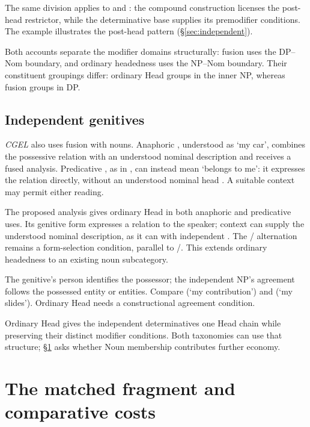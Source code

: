 \documentclass[12pt]{article}
\begin{document}
The same division applies to  and : the compound construction licenses the post-head restrictor, while the determinative base supplies its premodifier conditions. The example  illustrates the post-head pattern (§\ref{sec:independent}).

Both accounts separate the modifier domains structurally: fusion uses the DP--Nom boundary, and ordinary headedness uses the NP--Nom boundary. Their constituent groupings differ: ordinary Head groups  in the inner NP, whereas fusion groups  in DP.

\subsection{Independent genitives}\label{sec:genitive-head}

\textit{CGEL} also uses fusion with nouns. Anaphoric , understood as \enquote*{my car}, combines the possessive relation with an understood nominal description and receives a fused analysis. Predicative , as in , can instead mean \enquote*{belongs to me}: it expresses the relation directly, without an understood nominal head \citep[410--411, 470--471]{huddleston2002}. A suitable context may permit either reading.

The proposed analysis gives  ordinary Head in both anaphoric and predicative uses. Its genitive form expresses a relation to the speaker; context can supply the understood nominal description, as it can with independent . The / alternation remains a form-selection condition, parallel to /. This extends ordinary headedness to an existing noun subcategory.

The genitive's person identifies the possessor; the independent NP's agreement follows the possessed entity or entities. Compare  (\enquote*{my contribution}) and  (\enquote*{my slides}). Ordinary Head needs a constructional agreement condition.

Ordinary Head gives the independent determinatives one Head chain while preserving their distinct modifier conditions. Both taxonomies can use that structure; §\ref{sec:economy} asks whether Noun membership contributes further economy.

\section{The matched fragment and comparative costs}\label{sec:economy}
\end{document}
